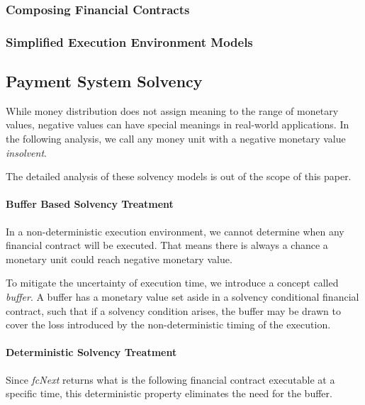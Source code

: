 \subsubsection{Composing Financial Contracts}



\subsubsection{Simplified Execution Environment Models}



\subsection{Payment System Solvency}

While money distribution does not assign meaning to the range of monetary values, negative values
can have special meanings in real-world applications. In the following analysis, we call any money
unit with a negative monetary value \textit{insolvent}.

The detailed analysis of these solvency models is out of the scope of this paper.

\paragraph{Buffer Based Solvency Treatment}

In a non-deterministic execution environment, we cannot determine when any financial contract will
be executed. That means there is always a chance a monetary unit could reach negative monetary
value.

To mitigate the uncertainty of execution time, we introduce a concept called \textit{buffer}. A
buffer has a monetary value set aside in a solvency conditional financial contract, such that if a
solvency condition arises, the buffer may be drawn to cover the loss introduced by the
non-deterministic timing of the execution.

\paragraph{Deterministic Solvency Treatment}

Since \textit{fcNext} returns what is the following financial contract executable at a specific
time, this deterministic property eliminates the need for the buffer.

